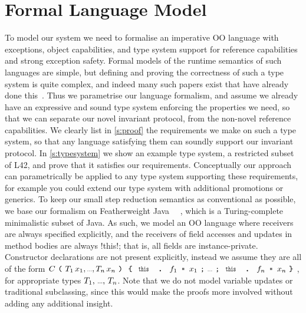 
\section{Formal Language Model}
\lstset{language=FortyFour} %
\label{s:formalism}
To model our system we need to formalise an imperative OO language
with exceptions,  object capabilities, and type system
support for reference capabilities and strong exception safety.
Formal models of the runtime semantics of such languages are simple, but
defining and proving the correctness of such a type system 
is quite complex, and indeed many such papers exist that have already done this~\cite{ServettoEtAl13a,ServettoZucca15,GordonEtAl12,clebsch2015deny,JOT:issue_2011_01/article1}.
Thus we parametrise our language formalism, and assume we already have an expressive and sound type system enforcing the properties we need, so
that we can separate our novel invariant protocol, from the non-novel reference capabilities.
We clearly list in \autoref{s:proof} the requirements we make on such a type system, so that any language satisfying them can soundly support our invariant protocol.
In \autoref{s:typesystem} we show an example type system, a restricted subset of L42, and prove that it satisfies our requirements. Conceptually our approach can parametrically be applied to any type system supporting these requirements, for example you could extend our type system with additional promotions or generics.
To keep our small step reduction semantics as conventional as possible, we base our formalism on Featherweight Java~
\cite{IgarashiEtAl01}~\cite[Chapter~19]{pierce2002types}, which is a Turing-complete~\cite{10.1016/j.tcs.2013.08.017} minimalistic subset of Java.
As such, we model an OO language where receivers are always specified explicitly, and the receivers of field accesses and updates in method bodies are always \Q!this!; that is, all fields are instance-private.
Constructor declarations are not present explicitly, instead we assume they are all of the form $C\oR \drange{T}{x} \cR\oC \drange[\semicolon]{\Kw{this}\D f}{\Kw{=}\,x} \cC$, for appropriate types $\range[\text{, }]{T}$. %
Note that we do not model variable updates or traditional subclassing, since this would make the proofs more involved without adding any additional insight.

